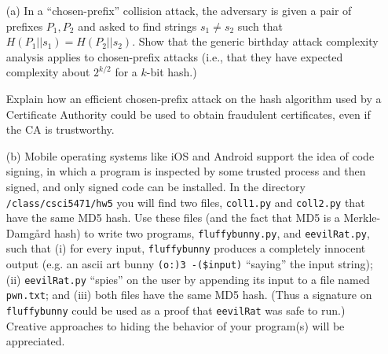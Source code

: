 \documentclass[11pt]{article}
\begin{document}
\begin{itemize}

  \item[(a)] In a ``chosen-prefix'' collision attack, the adversary is given a
  pair of prefixes $P_1, P_2$ and asked to find strings $s_1 \neq s_2$ such that
  $H(P_1||s_1) = H(P_2||s_2)$.  Show that the generic birthday attack complexity
  analysis applies to chosen-prefix attacks (i.e., that they have expected
  complexity about $2^{k/2}$ for a $k$-bit hash.)

  Explain how an efficient chosen-prefix attack on the hash algorithm used by a
  Certificate Authority could be used to obtain fraudulent certificates, even if the CA is
  trustworthy.

  \item[(b)] Mobile operating systems like iOS and Android support the idea of code signing, in which a program is inspected by some trusted process and then signed, and only signed code can be installed.  In the directory \verb#/class/csci5471/hw5# you will find two files, \verb#coll1.py# and \verb#coll2.py# that have the same MD5 hash.  Use these files (and the fact that MD5 is a Merkle-Damg{\aa}rd hash) to write two programs, \verb#fluffybunny.py#, and \verb#eevilRat.py#, such that (i) for every input, \verb#fluffybunny# produces a completely innocent output (e.g. an ascii art bunny \verb#(o:)3 -($input)# ``saying'' the input string); (ii) \verb#eevilRat.py# ``spies'' on the user by appending its input to a file named \verb#pwn.txt#; and (iii) both files have the same MD5 hash.  (Thus a signature on \verb#fluffybunny# could be used as a proof that \verb#eevilRat# was safe to run.)  Creative approaches to hiding the behavior of your program(s) will be appreciated.
\end{itemize}
\end{document}
